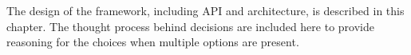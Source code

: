 The design of the framework, including API and architecture, is described in this chapter. The thought process behind decisions are included here to provide reasoning for the choices when multiple options are present.

%
%
%
